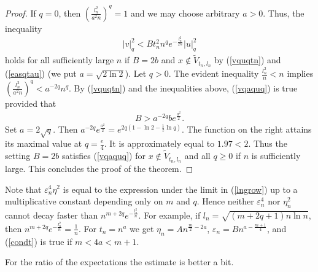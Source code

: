\documentclass[10pt]{amsart}
\theoremstyle{remark}
\let\td=\tilde
\begin{document}
\begin{proof}
If $q=0$, then $\left(\frac{l_n^2}{a^2n}\right)^q=1$ and we may
choose arbitrary $a>0$. Thus, the inequality
\begin{eqnarray}\label{vqaquq}
|v|_q^2<Bt_n^2n^qe^{-\frac{l_n^2}{2n}}|u|_q^2
\end{eqnarray}
holds for all sufficiently large $n$ if $B=2b$ and $x\notin\td
V_{t_n,l_n}$ by (\ref{vquqtn}) and (\ref{easqtau}) (we put
$a=\sqrt{2\ln2}$). Let $q>0$. The evident inequality
$\frac{l^2_n}{n}<n$ implies
$\left(\frac{l_n^2}{a^2n}\right)^q<a^{-2q}n^q$. By (\ref{vquqtn})
and the inequalities above, (\ref{vqaquq}) is true provided that
\begin{eqnarray*}
B>a^{-2q}be^{\frac{a^2}{2}}.
\end{eqnarray*}
Set $a=2\sqrt{q}$. Then $a^{-2q}e^{\frac{a^2}{2}}=e^{2q(1-\ln
2-\frac12\ln q)}$. The function on the right attains its maximal
value at $q=\frac{e}{4}$. It is approximately equal to $1.97<2$.
Thus the setting $B=2b$ satisfies (\ref{vqaquq}) for $x\notin\td
V_{t_n,l_n}$ and all $q\geq0$ if $n$ is sufficiently large. This
concludes the proof of the theorem.
\end{proof}

 Note that ${{\mathord{\varepsilon}}}_n^4\eta^2$ is equal to the expression under the
limit in (\ref{lngrow}) up to a multiplicative constant depending
only on $m$ and $q$. Hence neither ${{\mathord{\varepsilon}}}_n^4$ nor $\eta_n^2$ cannot
decay faster than $n^{m+2q}e^{-\frac{l_n^2}{n}}$. For example, if
$l_n=\sqrt{(m+2q+1)n\ln n}$, then
$n^{m+2q}e^{-\frac{l_n^2}{n}}=\frac1{n}$. For  $t_n=n^a$ we get
$\eta_n=An^{\frac{m}{2}-2a}$, ${{\mathord{\varepsilon}}}_n=Bn^{a-\frac{m+1}{4}}$, and
(\ref{condt}) is true if $m<4a<m+1$.

For the ratio of the expectations the estimate is better a bit.
\end{document}
